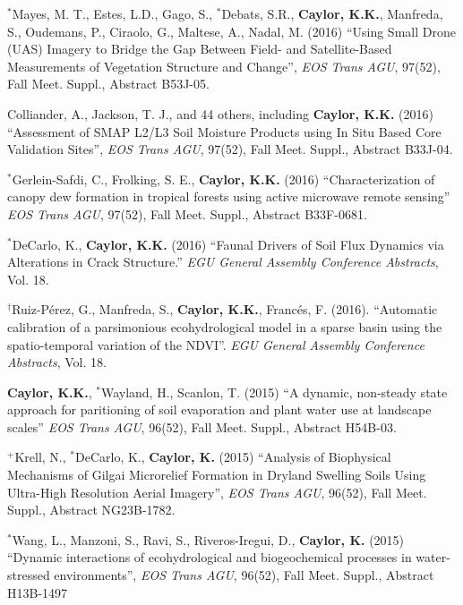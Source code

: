 \documentclass[10pt]{article}
\begin{document}
\begin{etaremune}
\item $^{*}$Mayes, M. T., Estes, L.D., Gago, S., $^{*}$Debats, S.R.,  \textbf{Caylor, K.K.}, Manfreda, S., Oudemans, P., Ciraolo, G., Maltese, A., Nadal, M. (2016) ``Using Small Drone (UAS) Imagery to Bridge the Gap Between Field- and Satellite-Based Measurements of Vegetation Structure and Change'', \emph{EOS Trans AGU}, 97(52), Fall Meet. Suppl., Abstract B53J-05.

\item Colliander, A., Jackson, T. J., and 44 others, including \textbf{Caylor, K.K.} (2016) ``Assessment of SMAP L2/L3 Soil Moisture Products using In Situ Based Core Validation Sites'',  \emph{EOS Trans AGU}, 97(52), Fall Meet. Suppl., Abstract B33J-04.

\item $^{*}$Gerlein-Safdi, C., Frolking, S. E., \textbf{Caylor, K.K.} (2016) ``Characterization of canopy dew formation in tropical forests using active microwave remote sensing'' \emph{EOS Trans AGU}, 97(52), Fall Meet. Suppl., Abstract B33F-0681.

\item  $^{*}$DeCarlo, K., \textbf{Caylor, K.K.} (2016) ``Faunal Drivers of Soil Flux Dynamics via Alterations in Crack Structure.'' \emph{EGU General Assembly Conference Abstracts}, Vol. 18.

\item $^{\dagger}$Ruiz-P\'erez, G., Manfreda, S.,  \textbf{Caylor, K.K.}, Franc\'es, F. (2016). ``Automatic calibration of a parsimonious ecohydrological model in a sparse basin using the spatio-temporal variation of the NDVI''. \emph{EGU General Assembly Conference Abstracts}, Vol. 18.

\item  \textbf{Caylor, K.K.}, $^{*}$Wayland, H., Scanlon, T. (2015) ``A dynamic, non-steady state approach for paritioning of soil evaporation and plant water use at landscape scales'' \emph{EOS Trans AGU}, 96(52), Fall Meet. Suppl., Abstract H54B-03.

\item $^{+}$Krell, N., $^{*}$DeCarlo, K., \textbf{Caylor, K.} (2015) ``Analysis of Biophysical Mechanisms of Gilgai Microrelief Formation in Dryland Swelling Soils Using Ultra-High Resolution Aerial Imagery'', \emph{EOS Trans AGU}, 96(52), Fall Meet. Suppl., Abstract NG23B-1782.

\item  $^{*}$Wang, L., Manzoni, S., Ravi, S., Riveros-Iregui, D., \textbf{Caylor, K.} (2015) ``Dynamic interactions of ecohydrological and biogeochemical processes in water-stressed environments'',  \emph{EOS Trans AGU}, 96(52), Fall Meet. Suppl., Abstract H13B-1497


\end{etaremune}
\end{document}
